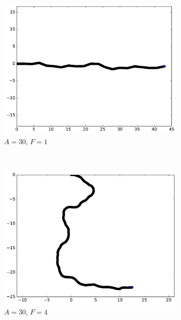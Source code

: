\begin{figure}[htb]
\begin{subfigure}[t]{\subImgWmo}
			\includegraphics[width=\textwidth]{figures/ch3/synTraj_219_30_1}
			\caption[$A = 30$, $F=1$]{$A = 30$, $F=1$}
			\label{fig:synTraj_219_30_1}
		\end{subfigure}
		~
		\begin{subfigure}[t]{\subImgWmo}
			\centering
			\includegraphics[width=\textwidth]{figures/ch3/synTraj_219_30_4}
			\caption[$A = 30$, $F=4$]{$A = 30$, $F=4$}
			\label{fig:synTraj_219_30_4}
		\end{subfigure}
		~
		\begin{subfigure}[t]{\subImgWmo}
			\centering

\end{subfigure}
\end{figure}
